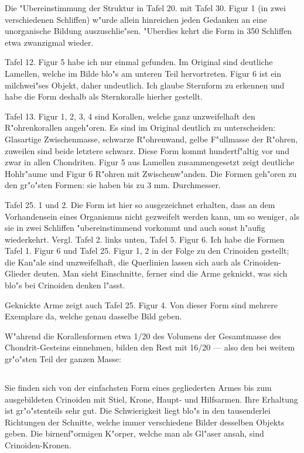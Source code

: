 \documentclass[a4paper, 11pt, oneside]{article}
\begin{document}
Die "Ubereinstimmung der Struktur in Tafel 20. mit Tafel 30. Figur 1 (in zwei verschiedenen Schliffen) w"urde allein hinreichen jeden Gedanken an eine unorganische Bildung auszuschlie"sen. "Uberdies kehrt die Form in 350 Schliffen etwa zwanzigmal wieder.

Tafel 12. Figur 5 habe ich nur einmal gefunden. Im Original sind deutliche Lamellen, welche im Bilde blo"s am unteren Teil hervortreten. Figur 6 ist ein milchwei"ses Objekt, daher undeutlich. Ich glaube Sternform zu erkennen und habe die Form deshalb als Sternkoralle hierher gestellt.

Tafel 13. Figur 1, 2, 3, 4 sind Korallen, welche ganz unzweifelhaft den R"ohrenkorallen angeh"oren. Es sind im Original deutlich zu unterscheiden: Glasartige Zwischenmasse, schwarze R"ohrenwand, gelbe F"ullmasse der R"ohren, zuweilen sind beide letztere schwarz. Diese Form kommt hundertf"altig vor und zwar in allen Chondriten. Figur 5 aus Lamellen zusammengesetzt zeigt deutliche Hohlr"aume und Figur 6 R"ohren mit Zwischenw"anden. Die Formen geh"oren zu den gr"o"sten Formen: sie haben bis zu 3 mm. Durchmesser.

Tafel 25. 1 und 2. Die Form ist hier so ausgezeichnet erhalten, dass an dem Vorhandensein eines Organismus nicht gezweifelt werden kann, um so weniger, als sie in zwei Schliffen "ubereinstimmend vorkommt und auch sonst h"aufig wiederkehrt. Vergl. Tafel 2. links unten, Tafel 5. Figur 6. Ich habe die Formen Tafel 1. Figur 6 und Tafel 25. Figur 1, 2 in der Folge zu den Crinoiden gestellt; die Kan"ale sind unzweifelhaft, die Querlinien lassen sich auch als Crinoiden-Glieder deuten. Man sieht Einschnitte, ferner sind die Arme geknickt, was sich blo"s bei Crinoiden denken l"asst.

Geknickte Arme zeigt auch Tafel 25. Figur 4. Von dieser Form sind mehrere Exemplare da, welche genau dasselbe Bild geben.

W"ahrend die Korallenformen etwa 1/20 des Volumens der Gesamtmasse des Chondrit-Gesteins einnehmen, bilden den Rest mit 16/20 --- also den bei weitem gr"o"sten Teil der ganzen Masse:
\clearpage
\subsection{}
\paragraph{}
Sie finden sich von der einfachsten Form eines gegliederten Armes bis zum ausgebildeten Crinoiden mit Stiel, Krone, Haupt- und Hilfsarmen. Ihre Erhaltung ist gr"o"stenteils sehr gut. Die Schwierigkeit liegt blo"s in den tausenderlei Richtungen der Schnitte, welche immer verschiedene Bilder desselben Objekts geben. Die birnenf"ormigen K"orper, welche man als Gl"aser ansah, sind Crinoiden-Kronen.
\end{document}
